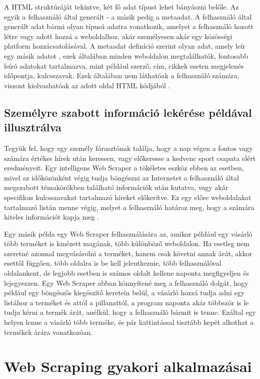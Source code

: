 A HTML struktúráját tekintve, két fő adat típust lehet bányászni belőle. Az egyik a felhasználó által generált - a másik pedig a metaadat. A felhasználó által generált adat bármi olyan típusú adatra vonatkozik, amelyet a felhasználó hozott létre vagy adott hozzá a weboldalhoz, akár személyesen akár egy közösségi platform hozzácsatolásával. A metaadat definíció szerint olyan adat, amely leír egy másik adatot \cite{landers2016primer}, ezek általában minden weboldalon megtalálhatók, fontosabb leíró adatokat tartalmazva, mint például szerző, cím, cikkek eseten megjelenés időpontja, kulcsszavak. Ezek általában nem láthatóak a felhasználó számára, viszont kiolvashatóak az adott oldal HTML kódjából \cite{landers2016primer}.

\subsection{Személyre szabott információ lekérése példával illusztrálva}

Tegyük fel, hogy egy személy fárasztónak találja, hogy a nap végen a fontos vagy számára értékes hírek után keressen, vagy előkeresse a kedvenc sport csapata elért eredményeit. Egy intelligens Web Scraper a tökéletes eszköz ebben az esetben, mivel az időközönként végig tudja böngészni az Internetet a felhasználó által megszabott témakörökben található információk után kutatva, vagy akár specifikus kulcsszavakat tartalmazó híreket előkerítve. Ez egy előre weboldalakat tartalmazó listán menne végig, melyet a felhasználó határoz meg, hogy a számára hiteles információt kapja meg \cite{dastidar2016intelligent}.

Egy másik példa egy Web Scraper felhasználására az, amikor például egy vásárló több terméket is kinézett magának, több különböző weboldalon. Ha esetleg nem szeretné azonnal megvásárolni a terméket, hanem csak követni annak árát, akkor esettől függően, több oldalra is be kell jelentkeznie, több felhasználóval oldalankent, de legjobb esetben is számos oldalt kellene naponta megfigyeljen és lejegyezzen. Egy Web Scraper abban könnyítené meg a felhasználó dolgát, hogy például egy böngészős kiegészítő keretein belül, a vásárló hozzá tudja adni egy listához a terméket és attól a pillanattól, a program naponta akár többször is le tudja kérni a termék árát, anélkül, hogy a felhasználó bármit is tenne. Ezáltal egy helyen lenne a vásárló több terméke, és pár kattintással tisztább kepét alkothat a termékek árára vonatkozóan.

\section{Web Scraping gyakori alkalmazásai}

